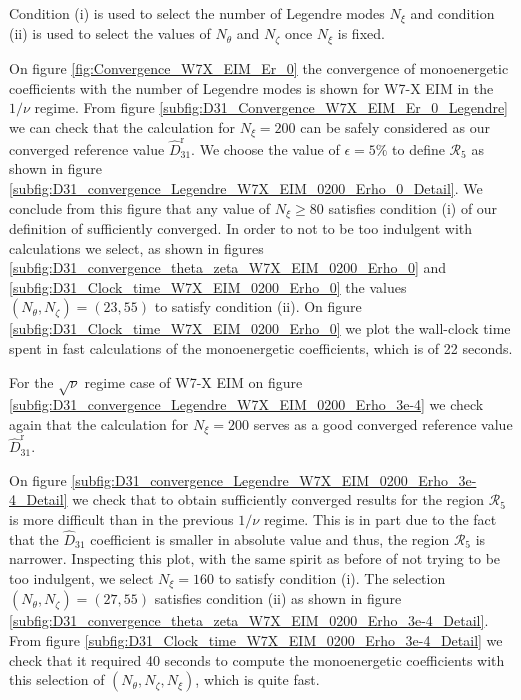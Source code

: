 Condition (i) is used to select the number of Legendre modes $N_\xi$ and condition (ii) is used to select the values of $N_\theta$ and $N_\zeta$ once $N_\xi$ is fixed. 

On figure \ref{fig:Convergence_W7X_EIM_Er_0} the convergence of monoenergetic coefficients with the number of Legendre modes is shown for W7-X EIM in the $1/\nu$ regime. From figure \ref{subfig:D31_Convergence_W7X_EIM_Er_0_Legendre} we can check that the calculation for $N_\xi=200$ can be safely considered as our converged reference value $\widehat{D}_{31}^{\text{r}}$. We choose the value of $\epsilon = 5 \%$ to define $\mathcal{R}_{5}$ as shown in figure \ref{subfig:D31_convergence_Legendre_W7X_EIM_0200_Erho_0_Detail}. We conclude from this figure that any value of $N_\xi\ge 80$ satisfies condition (i) of our definition of sufficiently converged. In order to not to be too indulgent with {\MONKES} calculations we select, as shown in figures \ref{subfig:D31_convergence_theta_zeta_W7X_EIM_0200_Erho_0} and \ref{subfig:D31_Clock_time_W7X_EIM_0200_Erho_0} the values $(N_\theta,N_\zeta)=(23,55)$ to satisfy condition (ii). On figure \ref{subfig:D31_Clock_time_W7X_EIM_0200_Erho_0} we plot the wall-clock time spent in {\MONKES} fast calculations of the monoenergetic coefficients, which is of 22 seconds.
%




For the $\sqrt{\nu}$ regime case of W7-X EIM on figure \ref{subfig:D31_convergence_Legendre_W7X_EIM_0200_Erho_3e-4} we check again that the calculation for $N_\xi=200$ serves as a good converged reference value $\widehat{D}_{31}^{\text{r}}$. 
%


On figure \ref{subfig:D31_convergence_Legendre_W7X_EIM_0200_Erho_3e-4_Detail} we check that to obtain sufficiently converged results for the region $\mathcal{R}_{5}$ is more difficult than in the previous $1/\nu$ regime. This is in part due to the fact that the $\widehat{D}_{31}$ coefficient is smaller in absolute value and thus, the region $\mathcal{R}_{5}$ is narrower. Inspecting this plot, with the same spirit as before of not trying to be too indulgent, we select $N_\xi=160$ to satisfy condition (i). The selection $(N_\theta,N_\zeta)=(27,55)$ satisfies condition (ii) as shown in figure \ref{subfig:D31_convergence_theta_zeta_W7X_EIM_0200_Erho_3e-4_Detail}. From figure \ref{subfig:D31_Clock_time_W7X_EIM_0200_Erho_3e-4_Detail} we check that it required 40 seconds to compute the monoenergetic coefficients with this selection of $(N_\theta,N_\zeta,N_\xi)$, which is quite fast.



